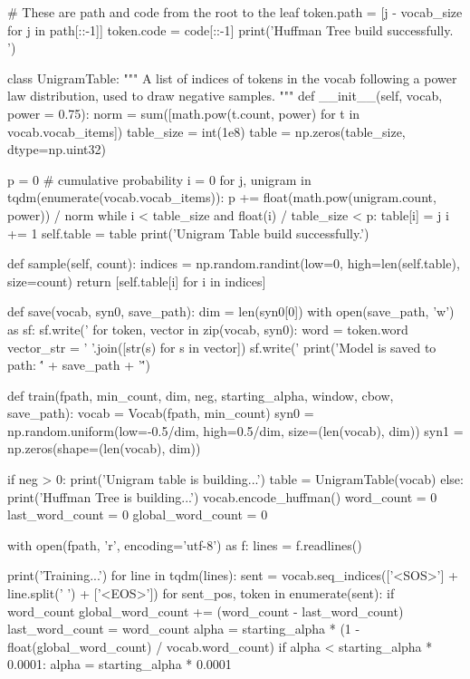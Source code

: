 \begin{python}
            # These are path and code from the root to the leaf
            token.path = [j - vocab_size for j in path[::-1]]
            token.code = code[::-1]
        print('Huffman Tree build successfully. ')

class UnigramTable:
    """
    A list of indices of tokens in the vocab following a power law distribution,
    used to draw negative samples.
    """
    def __init__(self, vocab, power = 0.75):
        norm = sum([math.pow(t.count, power) for t in vocab.vocab_items])
        table_size = int(1e8)
        table = np.zeros(table_size, dtype=np.uint32)

        p = 0  # cumulative probability
        i = 0
        for j, unigram in tqdm(enumerate(vocab.vocab_items)):
            p += float(math.pow(unigram.count, power)) / norm
            while i < table_size and float(i) / table_size < p:
                table[i] = j
                i += 1
        self.table = table
        print('Unigram Table build successfully.')

    def sample(self, count):
        indices = np.random.randint(low=0, high=len(self.table), size=count)
        return [self.table[i] for i in indices]

def save(vocab, syn0, save_path):
    dim = len(syn0[0])
    with open(save_path, 'w') as sf:
        sf.write('%
        for token, vector in zip(vocab, syn0):
            word = token.word
            vector_str = ' '.join([str(s) for s in vector])
            sf.write('%
    print('Model is saved to path: \'' + save_path + '\'')

def train(fpath, min_count, dim, neg, starting_alpha, window, cbow, save_path):
    vocab = Vocab(fpath, min_count)
    syn0 = np.random.uniform(low=-0.5/dim, high=0.5/dim, size=(len(vocab), dim))
    syn1 = np.zeros(shape=(len(vocab), dim))

    if neg > 0:
        print('Unigram table is building...')
        table = UnigramTable(vocab)
    else:
        print('Huffman Tree is building...')
        vocab.encode_huffman()
    word_count = 0
    last_word_count = 0
    global_word_count = 0

    with open(fpath, 'r', encoding='utf-8') as f:
        lines = f.readlines()

    print('Training...')
    for line in tqdm(lines):
        sent = vocab.seq_indices(['<SOS>'] + line.split(' ') + ['<EOS>'])
        for sent_pos, token in enumerate(sent):
            if word_count %
                global_word_count += (word_count - last_word_count)
                last_word_count = word_count
                alpha = starting_alpha * (1 - float(global_word_count) / vocab.word_count)
                if alpha < starting_alpha * 0.0001: alpha = starting_alpha * 0.0001


\end{python}

